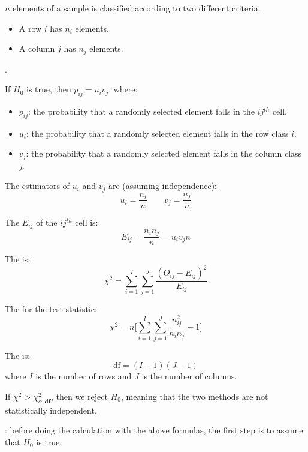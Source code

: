 \begin{multicols}{2}
  \par $n$ elements of a sample is classified according to two different criteria.
    \begin{itemize}
      \item A row $i$ has $n_i$ elements.
      \item A column $j$ has $n_j$ elements.
    \end{itemize}
  \par {}.
  \par If $H_0$ is true, then $p_{ij} = u_i v_j$, where:
    \begin{itemize}
      \item $p_{ij}$: the probability that a randomly selected element falls in the $ij^{th}$ cell.
      \item $u_{i}$: the probability that a randomly selected element falls in the row class $i$.
      \item $v_{j}$: the probability that a randomly selected element falls in the column class $j$.
    \end{itemize}
  \par The estimators of $u_i$ and $v_j$ are (assuming independence):
    \[
      u_i = \frac{n_i}{n} \qquad v_j = \frac{n_j}{n}
    \]
  \par The  $E_{ij}$ of the $ij^{th}$ cell is:
    \[
      E_{ij} = \frac{n_i n_j}{n} = u_i v_j n
    \]
  \par The  is:
    \[
      \chi^2 = \sum\limits_{i = 1}^{I} \sum\limits_{j = 1}^{J} \frac{(O_{ij} - E_{ij})^2}{E_{ij}}
    \]
  \par The  for the test statistic:
    \[
      \chi^2 = n \bigg[
        \sum\limits_{i = 1}^{I} \sum\limits_{j = 1}^{J} \frac{n_{ij}^2}{n_i n_j} - 1
        \bigg]
    \]
  \par The  is: 
    \[
      \text{df} = (I - 1)(J - 1)
    \]
    where $I$ is the number of rows and $J$ is the number of columns.
  \par If $\chi^2 > \chi^2_{\alpha, \textbf{df}}$, then we reject $H_0$, meaning that the two methods are not statistically independent.
  \par {}: before doing the calculation with the above formulas, the first step is to assume that $H_0$ is true.


  \end{multicols}